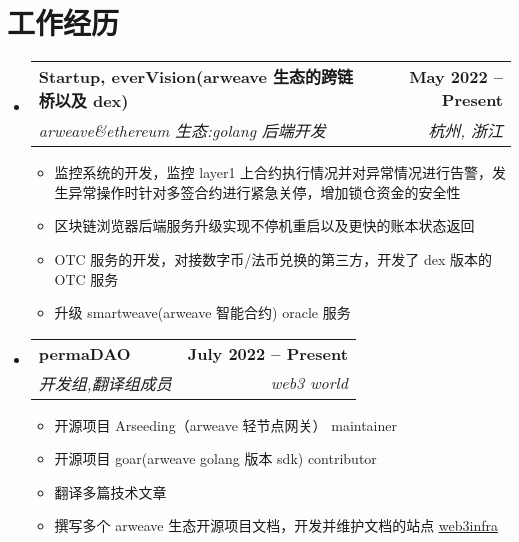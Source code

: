 \documentclass[letterpaper,11pt]{ctexart}
\makeatletter
\newcommand{\resumeItem}[1]{
  \item\small{
    {#1 \vspace{-2pt}}
  }
}
\newcommand{\resumeSubheading}[4]{
  \vspace{-2pt}\item
    \begin{tabular*}{1.0\textwidth}[t]{l@{\extracolsep{\fill}}r}
      \textbf{#1} & \textbf{\small #2} \\
      \textit{\small#3} & \textit{\small #4} \\
    \end{tabular*}\vspace{-7pt}
}
\newcommand{\resumeSubHeadingListStart}{\begin{itemize}[leftmargin=0.0in, label={}]}
\newcommand{\resumeSubHeadingListEnd}{\end{itemize}}
\newcommand{\resumeItemListStart}{\begin{itemize}}
\newcommand{\resumeItemListEnd}{\end{itemize}\vspace{-5pt}}
\makeatother
\begin{document}
\section{工作经历}
  \resumeSubHeadingListStart

    \resumeSubheading
      {Startup, everVision(arweave 生态的跨链桥以及 dex)}{May 2022 -- Present}
      {arweave\&ethereum 生态:golang 后端开发}{杭州, 浙江}
      \resumeItemListStart
        \resumeItem{监控系统的开发，监控 layer1 上合约执行情况并对异常情况进行告警，发生异常操作时针对多签合约进行紧急关停，增加锁仓资金的安全性}
        \resumeItem{区块链浏览器后端服务升级实现不停机重启以及更快的账本状态返回}
        \resumeItem{OTC 服务的开发，对接数字币/法币兑换的第三方，开发了 dex 版本的 OTC 服务}
        \resumeItem{升级 smartweave(arweave 智能合约) oracle 服务}
      \resumeItemListEnd

    \resumeSubheading
      {permaDAO}{July 2022 -- Present}
      {开发组,翻译组成员}{web3 world}
      \resumeItemListStart
        \resumeItem{开源项目 Arseeding（arweave 轻节点网关） maintainer}
        \resumeItem{开源项目 goar(arweave golang 版本 sdk) contributor}
        \resumeItem{翻译多篇技术文章}
        \resumeItem{撰写多个 arweave 生态开源项目文档，开发并维护文档的站点 \href{https://web3infra.dev/}{\underline{web3infra}}}
    \resumeItemListEnd
    
  \resumeSubHeadingListEnd
\vspace{-16pt}

\end{document}
